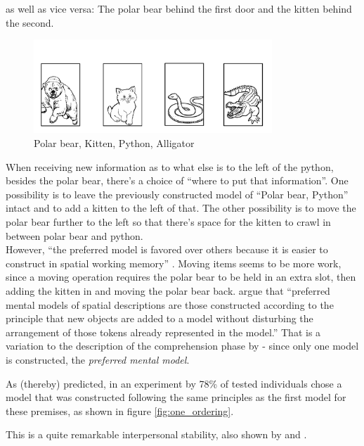\documentclass[hidelinks]{scrartcl}
\begin{document}
as well as vice versa: The polar bear behind the first door and the kitten behind the second.
\begin{figure}[H]
	\caption{Polar bear, Kitten, Python, Alligator}
	\label{fig:different_ordering}
	\centering
	\includegraphics[width=0.8\textwidth]{Illustrations/doors_animals_2.png}
\end{figure}

When receiving new information as to what else is to the left of the python, besides the polar bear, there's a choice of ``where to put that information''. One possibility is to leave the previously constructed model of ``Polar bear, Python'' intact and to add a kitten to the left of that. The other possibility is to move the polar bear further to the left so that there's space for the kitten to crawl in between polar bear and python. \\
However, ``the preferred model is favored over others because it is easier to construct in spatial working memory'' \citep{Ragni.2013}. Moving items seems to be more work, since a moving operation requires the polar bear to be held in an extra slot, then adding the kitten in and moving the polar bear back. \cite{Ragni.2013} argue that ``preferred mental models of spatial descriptions are those constructed according to the principle that new objects are added to a model without disturbing the arrangement of those tokens already represented in the model.'' That is a variation to the description of the comprehension phase by \citet{Johnson-Laird.1991} - since only one model is constructed, the \textit{preferred mental model}.

As (thereby) predicted, in an experiment by \cite{Ragni.2013} 78\% of tested individuals chose a model that was constructed following the same principles as the first model for these premises, as shown in figure \ref{fig:one_ordering}.

This is a quite remarkable interpersonal stability, also shown by \cite{Knauff.2013} and \cite{Rauh.2005}.\\
\end{document}
